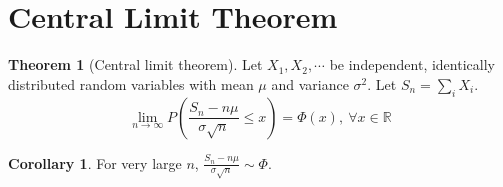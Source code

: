\documentclass[10pt, a4paper]{extarticle}
\theoremstyle{definition}
\newtheorem{thm}{Theorem}
\newtheorem{cor}{Corollary}[thm]
\begin{document}
	\section{Central Limit Theorem}
	\begin{thm}[Central limit theorem]
		Let $X_1,X_2,\cdots$ be independent, identically distributed random variables with mean $\mu$ and variance $\sigma^2$. Let $S_n=\sum_iX_i$.
		\[\lim_{n\to\infty}P\left(\frac{S_n-n\mu}{\sigma\sqrt{n}}\leq x\right)=\Phi(x),\ \forall x\in\mathbb{R}\]
	\end{thm}

	\begin{cor}
		For very large $n$, $\frac{S_n-n\mu}{\sigma\sqrt{n}}\sim\Phi$.
	\end{cor}
\end{document}
